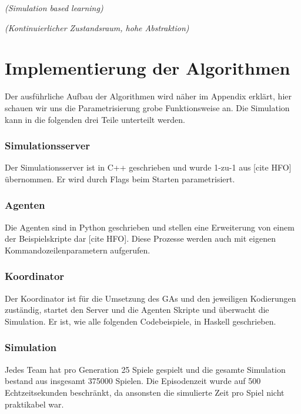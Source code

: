             \begin{center} \textit{(Simulation based learning)} \end{center}
            \begin{center} \textit{(Kontinuierlicher Zustandsraum, hohe Abstraktion)} \end{center}

    \section{Implementierung der Algorithmen}
        Der ausführliche Aufbau der Algorithmen wird näher im Appendix erklärt, hier schauen wir uns die Parametrisierung grobe Funktionsweise an. Die Simulation kann in die folgenden drei Teile unterteilt werden.

        \subsubsection*{Simulationsserver}
        Der Simulationsserver ist in C++ geschrieben und wurde 1-zu-1 aus [cite HFO] übernommen. Er wird durch Flags beim Starten parametrisiert.

        \subsubsection*{Agenten}
        Die Agenten sind in Python geschrieben und stellen eine Erweiterung von einem der Beispielskripte dar [cite HFO]. Diese Prozesse werden auch mit eigenen Kommandozeilenparametern aufgerufen.

        \subsubsection*{Koordinator}
        Der Koordinator ist für die Umsetzung des GAs und den jeweiligen Kodierungen zuständig, startet den Server und die Agenten Skripte und überwacht die Simulation. Er ist, wie alle folgenden Codebeispiele, in Haskell geschrieben.

        \subsubsection*{Simulation}
        Jedes Team hat pro Generation 25 Spiele gespielt und die gesamte Simulation bestand aus insgesamt 375000 Spielen.
        Die Episodenzeit wurde auf 500 Echtzeitsekunden beschränkt, da ansonsten die simulierte Zeit pro Spiel nicht praktikabel war. \\

